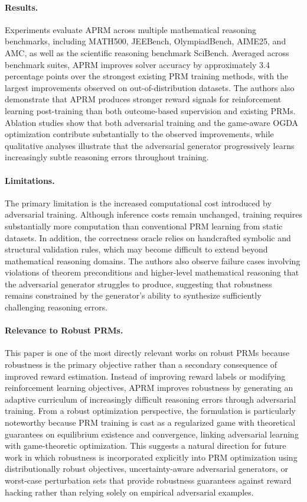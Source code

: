\documentclass[11pt]{article}
\begin{document}
\paragraph{Results.}
Experiments evaluate APRM across multiple mathematical reasoning benchmarks, including MATH500, JEEBench, OlympiadBench, AIME25, and AMC, as well as the scientific reasoning benchmark SciBench. Averaged across benchmark suites, APRM improves solver accuracy by approximately 3.4 percentage points over the strongest existing PRM training methods, with the largest improvements observed on out-of-distribution datasets. The authors also demonstrate that APRM produces stronger reward signals for reinforcement learning post-training than both outcome-based supervision and existing PRMs. Ablation studies show that both adversarial training and the game-aware OGDA optimization contribute substantially to the observed improvements, while qualitative analyses illustrate that the adversarial generator progressively learns increasingly subtle reasoning errors throughout training. 

\paragraph{Limitations.}
The primary limitation is the increased computational cost introduced by adversarial training. Although inference costs remain unchanged, training requires substantially more computation than conventional PRM learning from static datasets. In addition, the correctness oracle relies on handcrafted symbolic and structural validation rules, which may become difficult to extend beyond mathematical reasoning domains. The authors also observe failure cases involving violations of theorem preconditions and higher-level mathematical reasoning that the adversarial generator struggles to produce, suggesting that robustness remains constrained by the generator's ability to synthesize sufficiently challenging reasoning errors. 

\paragraph{Relevance to Robust PRMs.}
This paper is one of the most directly relevant works on robust PRMs because robustness is the primary objective rather than a secondary consequence of improved reward estimation. Instead of improving reward labels or modifying reinforcement learning objectives, APRM improves robustness by generating an adaptive curriculum of increasingly difficult reasoning errors through adversarial training. From a robust optimization perspective, the formulation is particularly noteworthy because PRM training is cast as a regularized game with theoretical guarantees on equilibrium existence and convergence, linking adversarial learning with game-theoretic optimization. This suggests a natural direction for future work in which robustness is incorporated explicitly into PRM optimization using distributionally robust objectives, uncertainty-aware adversarial generators, or worst-case perturbation sets that provide robustness guarantees against reward hacking rather than relying solely on empirical adversarial examples.
\end{document}

